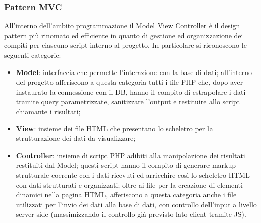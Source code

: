 \documentclass[a4paper,10pt]{article}
\begin{document}
	\subsubsection{Pattern MVC}
	All'interno dell'ambito programmazione il Model View Controller è il design pattern più rinomato ed efficiente in quanto di gestione ed organizzazione dei compiti per ciascuno script interno al progetto. In particolare si riconoscono le seguenti categorie:
	\begin{itemize}
		\item \textbf{Model}: interfaccia che permette l'interazione con la base di dati; all'interno del progetto afferiscono a questa categoria tutti i file PHP che, dopo aver instaurato la connessione con il DB, hanno il compito di estrapolare i dati tramite query parametrizzate, sanitizzare l'output e restituire allo script chiamante i risultati;
		\item \textbf{View}: insieme dei file HTML che presentano lo scheletro per la strutturazione dei dati da visualizzare;
		\item \textbf{Controller}: insieme di script PHP adibiti alla manipolazione dei risultati restituiti dal Model; questi script hanno il compito di generare markup strutturale coerente con i dati ricevuti ed arricchire così lo scheletro HTML con dati strutturati e organizzati; oltre ai file per la creazione di elementi dinamici nella pagina HTML, afferiscono a questa categoria anche i file utilizzati per l'invio dei dati alla base di dati, con controllo dell'input a livello server-side (massimizzando il controllo già previsto lato client tramite JS).
	\end{itemize}
\end{document}
